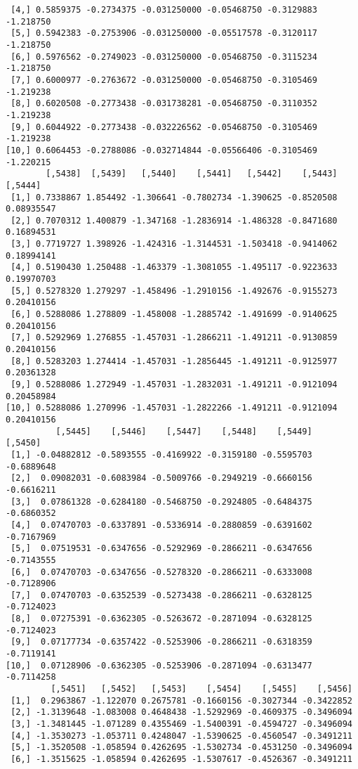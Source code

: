 \documentclass[
  letterpaper,
  DIV=11,
  numbers=noendperiod]{scrreprt}
\begin{document}
\begin{verbatim}
 [4,] 0.5859375 -0.2734375 -0.031250000 -0.05468750 -0.3129883 -1.218750
 [5,] 0.5942383 -0.2753906 -0.031250000 -0.05517578 -0.3120117 -1.218750
 [6,] 0.5976562 -0.2749023 -0.031250000 -0.05468750 -0.3115234 -1.218750
 [7,] 0.6000977 -0.2763672 -0.031250000 -0.05468750 -0.3105469 -1.219238
 [8,] 0.6020508 -0.2773438 -0.031738281 -0.05468750 -0.3110352 -1.219238
 [9,] 0.6044922 -0.2773438 -0.032226562 -0.05468750 -0.3105469 -1.219238
[10,] 0.6064453 -0.2788086 -0.032714844 -0.05566406 -0.3105469 -1.220215
        [,5438]  [,5439]   [,5440]    [,5441]   [,5442]    [,5443]    [,5444]
 [1,] 0.7338867 1.854492 -1.306641 -0.7802734 -1.390625 -0.8520508 0.08935547
 [2,] 0.7070312 1.400879 -1.347168 -1.2836914 -1.486328 -0.8471680 0.16894531
 [3,] 0.7719727 1.398926 -1.424316 -1.3144531 -1.503418 -0.9414062 0.18994141
 [4,] 0.5190430 1.250488 -1.463379 -1.3081055 -1.495117 -0.9223633 0.19970703
 [5,] 0.5278320 1.279297 -1.458496 -1.2910156 -1.492676 -0.9155273 0.20410156
 [6,] 0.5288086 1.278809 -1.458008 -1.2885742 -1.491699 -0.9140625 0.20410156
 [7,] 0.5292969 1.276855 -1.457031 -1.2866211 -1.491211 -0.9130859 0.20410156
 [8,] 0.5283203 1.274414 -1.457031 -1.2856445 -1.491211 -0.9125977 0.20361328
 [9,] 0.5288086 1.272949 -1.457031 -1.2832031 -1.491211 -0.9121094 0.20458984
[10,] 0.5288086 1.270996 -1.457031 -1.2822266 -1.491211 -0.9121094 0.20410156
          [,5445]    [,5446]    [,5447]    [,5448]    [,5449]    [,5450]
 [1,] -0.04882812 -0.5893555 -0.4169922 -0.3159180 -0.5595703 -0.6889648
 [2,]  0.09082031 -0.6083984 -0.5009766 -0.2949219 -0.6660156 -0.6616211
 [3,]  0.07861328 -0.6284180 -0.5468750 -0.2924805 -0.6484375 -0.6860352
 [4,]  0.07470703 -0.6337891 -0.5336914 -0.2880859 -0.6391602 -0.7167969
 [5,]  0.07519531 -0.6347656 -0.5292969 -0.2866211 -0.6347656 -0.7143555
 [6,]  0.07470703 -0.6347656 -0.5278320 -0.2866211 -0.6333008 -0.7128906
 [7,]  0.07470703 -0.6352539 -0.5273438 -0.2866211 -0.6328125 -0.7124023
 [8,]  0.07275391 -0.6362305 -0.5263672 -0.2871094 -0.6328125 -0.7124023
 [9,]  0.07177734 -0.6357422 -0.5253906 -0.2866211 -0.6318359 -0.7119141
[10,]  0.07128906 -0.6362305 -0.5253906 -0.2871094 -0.6313477 -0.7114258
         [,5451]   [,5452]   [,5453]    [,5454]    [,5455]    [,5456]
 [1,]  0.2963867 -1.122070 0.2675781 -0.1660156 -0.3027344 -0.3422852
 [2,] -1.3139648 -1.083008 0.4648438 -1.5292969 -0.4609375 -0.3496094
 [3,] -1.3481445 -1.071289 0.4355469 -1.5400391 -0.4594727 -0.3496094
 [4,] -1.3530273 -1.053711 0.4248047 -1.5390625 -0.4560547 -0.3491211
 [5,] -1.3520508 -1.058594 0.4262695 -1.5302734 -0.4531250 -0.3496094
 [6,] -1.3515625 -1.058594 0.4262695 -1.5307617 -0.4526367 -0.3491211

\end{verbatim}
\end{document}
